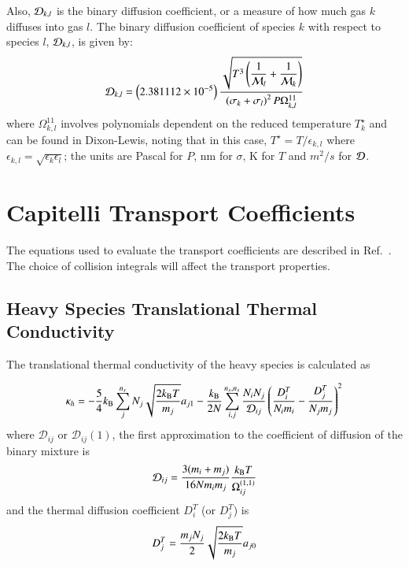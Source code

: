 \documentclass{warpdoc}
\newcommand{\mfd}{\displaystyle}
\begin{document}
Also, ${\cal D}_{k,l}$ is the binary diffusion coefficient, or
a measure of how much gas $k$ diffuses into gas $l$. The binary diffusion coefficient of species $k$ with respect to species $l$,
${\cal D}_{k,l}$, is given by:
%
\begin{equation}
{\cal D}_{k,l}=\left( 2.381112 \times 10^{-5} \right) \frac{\sqrt{T^3 \mfd  \left(\frac{1}{{\cal M}_l} + \frac{1}{{\cal M}_k} \right)}}
              {  \left( \sigma_k + \sigma_l \right)^2 P \Omega^{11}_{k,l}}
\label{eqn:moldiff-binary}
\end{equation}
%
where $\Omega^{11}_{k,l}$ involves
polynomials dependent on the reduced temperature $T^\star_k$
and can be found in Dixon-Lewis, noting that in this case, $T^\star=T/\epsilon_{k,l}$
where $\epsilon_{k,l}=\sqrt{\epsilon_k \epsilon_l}$; the units are Pascal for $P$, nm for $\sigma$,
K for $T$ and $m^2/s$ for $\cal D$.

\section{Capitelli Transport Coefficients}

The equations used to evaluate the transport coefficients are described in Ref.\ \cite{tepjd:2000:capitelli}. The choice of collision integrals will affect the transport properties. 
\subsection{Heavy Species Translational Thermal Conductivity}

The translational thermal conductivity of the heavy species is calculated as

\begin{equation}\label{eq:heavykappa}
  \kappa_h=-\frac{5}{4}k_{\rm B}\sum_{j}^{n_s} N_{j}\sqrt{\frac{2k_{\rm B}T}{m_j}}a_{j1}-\frac{k_{\rm B}}{2N}\sum_{i,j}^{n_s,n_s}\frac{N_{i}N_{j}}{\mathcal{D}_{i j}}\left(\frac{D_{i}^{T}}{N_{i}m_{i}}-\frac{D_{j}^{T}}{N_{j}m_{j}}\right)^{2}
\end{equation}
where $\mathcal{D}_{i j}$ or $\mathcal{D}_{i j}(1)$, the first approximation to the coefficient of diffusion of the binary mixture is
\begin{equation}
  {\cal D}_{ij}=\frac{3(m_i+m_j)}{16N m_i m_j}\frac{k_{\rm B}T}{\Omega_{ij}^{(1,1)}}
\end{equation}
and the thermal diffusion coefficient $D_i^T$ (or $D_j^T$) is
\begin{equation}\label{eq:Tdiffcoeff}
  D_j^T=\frac{m_j N_j}{2}\sqrt{\frac{2 k_{\rm B} T}{m_j}}a_{j0}
\end{equation}
\end{document}
